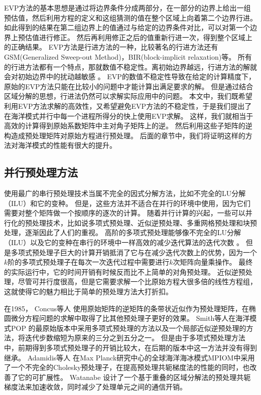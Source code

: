 EVP方法的基本思想是通过将边界条件分成两部分，在一部分的边界上给出一组预估值，然后利用方程的定义和这组猜测的值在整个区域上向着第二个边界行进。
如此得到的结果在第二组边界上的值通过与给定的边界条件对比，可以对第一个边界上预估值进行修正。 然后再利用修正之后的值重新行进一次，得到整个区域上的正确结果\cite{roache1995elliptic}。 
EVP方法是行进方法的一种，比较著名的行进方法还有GSM(Generalized Sweep-out Method)\cite{hirota1970direct}，BIR(block-implicit relaxation)\cite{dietrich1975optimized}等。
所有的行进方法都有一个特点，那就数值不稳定性。离初始边界越远，行进方法的解就会对初始边界中的扰动越敏感 \cite{roache1995elliptic}。
EVP的数值不稳定性导致在给定的计算精度下，原始的EVP方法只能在比较小的问题中才能计算出满足要求的解。 
但是通过结合区域分解的思想，行进法仍然可以求解实际应用中的问题。 
本文中，我们既希望利用EVP方法求解的高效性，又希望避免EVP方法的不稳定性，于是我们提出了在海洋模式并行中每一个进程所得分的快上使用EVP求解。 
这样，我们就相当于高效的计算得到原始系数矩阵中主对角子矩阵上的逆。 然后利用这些子矩阵的逆构造成预处理矩阵对原始方程进行预处理。 
后面的章节中，我们将证明这样的方法对海洋模式的性能有很大的提升。 





\subsection{并行预处理方法}
\label{related:parall}

使用最广的串行预处理技术当属不完全的因式分解方法，比如不完全的LU分解（ILU）和它的变种\cite{benzi2002preconditioning}。 
但是，这些方法并不适合在并行的环境中使用，因为它们需要对整个矩阵做一个按顺序的逐次的计算。 
随着并行计算的兴起，一些可以并行化的预处理技术，比如说多项式预处理、近似逆预处理、多重网格预处理和块预处理，逐渐因此了人们的重视。 
高阶的多项式预处理能够像不完全的LU分解（ILU）以及它的变种在串行的环境中一样高效的减少迭代算法的迭代次数\cite{benzi2002preconditioning} 。 
但是多项式预处理子巨大的计算开销抵消了它与在减少迭代次数上的优势，因为一个$k$阶的多项式预处理子在每次一次迭代过程中需要进行$k$次矩阵向量乘操作。 
最终的实际运行中，它的时间开销有时候反而比不上简单的对角预处理\cite{meyer1989numerical,smith1992parallel}。
近似逆预处理，尽管可并行度很高，但是它需要求解一个比原始方程大很多倍的线性方程组\cite{smith1992parallel,bergamaschi2007numerical}， 这就使得它的魅力相比于简单的预处理方法大打折扣。

在1985， Concus等人 \cite{concus1985block} 使用原始矩阵的逆矩阵的条带状近似作为预处理矩阵，在椭圆微分方程问题的求解中取得了比其他预处理子更好的效果。 
Smith等人\cite{smith1992parallel}在海洋模式POP 的最原始版本中采用多项式预处理的方法以及一个局部近似逆预处理的方法，将迭代步数缩短为原来的三分之到五分之一。
但是由于多项式预处理方法中，前期得到多项式预处理子的开销比较大，在后期的版本中这一方法并没有得到继承。  
Adamidis等人 \cite{adamidis2011high} 在Max Planck研究中心的全球海洋海冰模式MPIOM中采用了一个不完全的Cholesky预处理子，在提高预处理共轭梯度法的性能的同时，也改善了它的可扩展性。 
Watanabe \cite{Watanabe2006pcg} 设计了一个基于重叠的区域分解法的预处理共轭梯度法来加速收敛，同时减少了处理单元之间的通信开销。 
 
